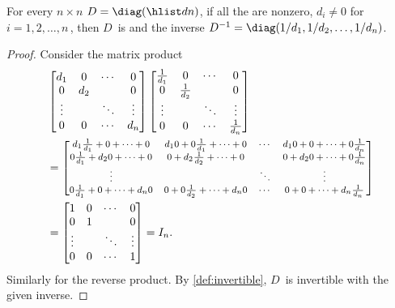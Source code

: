 \begin{theorem} \label{thm:idm}
For every \(n\times n\)   \(D=\diag(\hlist dn)\), 
if all the  are nonzero, \(d_{i}\neq 0\) for \(i=1,2,\ldots,n\)\,, then \(D\)~is  and the inverse \(D^{-1}=\diag(1/d_{1},1/d_{2},\ldots,1/d_{n})\).
\end{theorem}
\begin{proof} 
Consider the matrix product 
\begin{align*}&
\begin{bmatrix} d_1&0&\cdots&0
\\0&d_2&&0
\\\vdots&&\ddots&\vdots
\\0&0&\cdots&d_n \end{bmatrix}
\begin{bmatrix} \frac1{d_1}&0&\cdots&0
\\0&\frac1{d_2}&&0
\\\vdots&&\ddots&\vdots
\\0&0&\cdots&\frac1{d_n} \end{bmatrix}
\\&=
\footnotesize%
\begin{bmatrix} d_1\frac1{d_1}+0+\cdots+0
&d_10+0\frac1{d_1}+\cdots+0
&\cdots&d_10+0+\cdots+0\frac1{d_n}
\\0\frac1{d_1}+d_20+\cdots+0
&0+d_2\frac1{d_2}+\cdots+0
&&0+d_20+\cdots+0\frac1{d_n}
\\\vdots&&\ddots&\vdots
\\0\frac1{d_1}+0+\cdots+d_n0
&0+0\frac1{d_2}+\cdots+d_n0
&\cdots&0+0+\cdots+d_n\frac1{d_n} \end{bmatrix}
\\&=\begin{bmatrix} 1&0&\cdots&0
\\0&1&&0
\\\vdots&&\ddots&\vdots
\\0&0&\cdots&1 \end{bmatrix}=I_n.
\end{align*}
Similarly for the reverse product.
By \autoref{def:invertible}, \(D\)~is invertible with the given inverse.
\end{proof}




